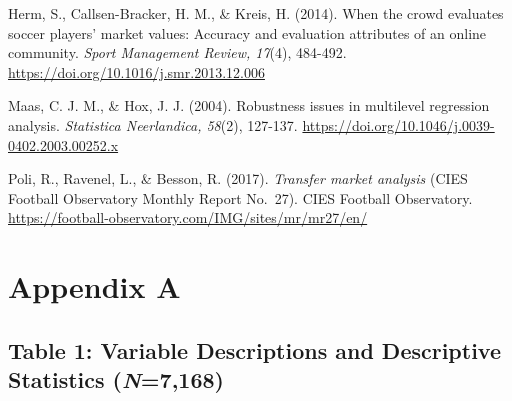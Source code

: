 \documentclass[
  12pt,
]{article}
\begin{document}
Herm, S., Callsen-Bracker, H. M., \& Kreis, H. (2014). When the crowd
evaluates soccer players' market values: Accuracy and evaluation
attributes of an online community. \emph{Sport Management Review,
17}(4), 484-492. \url{https://doi.org/10.1016/j.smr.2013.12.006}

Maas, C. J. M., \& Hox, J. J. (2004). Robustness issues in multilevel
regression analysis. \emph{Statistica Neerlandica, 58}(2), 127-137.
\url{https://doi.org/10.1046/j.0039-0402.2003.00252.x}

Poli, R., Ravenel, L., \& Besson, R. (2017). \emph{Transfer market
analysis} (CIES Football Observatory Monthly Report No.~27). CIES
Football Observatory.
\url{https://football-observatory.com/IMG/sites/mr/mr27/en/}

\clearpage

\newpage

\section{Appendix A}\label{appendix-a}

\subsection*{\texorpdfstring{Table 1: Variable Descriptions and
Descriptive Statistics
(\emph{N}=7,168)}{Table 1: Variable Descriptions and Descriptive Statistics (N=7,168)}}\label{table-1-variable-descriptions-and-descriptive-statistics-n7168}
\end{document}
